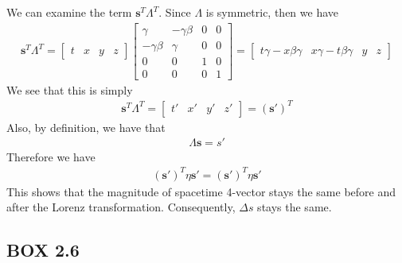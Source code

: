 \documentclass[12pt]{book}
\newcommand{\paren}[1]{\left( #1 \right)}
\begin{document}
We can examine the term $\mathbf{s}^T\Lambda^T$. Since $\Lambda$ is symmetric, then we have 
\begin{align}
\mathbf{s}^T\Lambda^T = \begin{bmatrix}
    t&x&y&z
\end{bmatrix}\begin{bmatrix}
\gamma & -\gamma\beta & 0 & 0 \\
-\gamma\beta & \gamma & 0 & 0 \\
0 & 0 & 1 & 0 \\
0 & 0 & 0 & 1
\end{bmatrix} = \left[\begin{matrix}
t\gamma-x\beta\gamma & x\gamma-t\beta\gamma & y & z
\end{matrix}\right]
\end{align}
We see that this is simply
\begin{align}
\mathbf{s}^T\Lambda^T = \left[\begin{matrix}
t' & x' & y' & z'
\end{matrix}\right] = \paren{\mathbf{s}'}^T
\end{align}
Also, by definition, we have that
\begin{align}
\Lambda\mathbf{s} = s'
\end{align}
Therefore we have
\begin{align}
\paren{\mathbf{s}'}^T\eta\mathbf{s}' = \paren{\mathbf{s}'}^T\eta\mathbf{s}'
\end{align}
This shows that the magnitude of spacetime 4-vector stays the same before and after the Lorenz transformation. Consequently, $\Delta s$ stays the same. 

\subsection{BOX 2.6}
\end{document}
